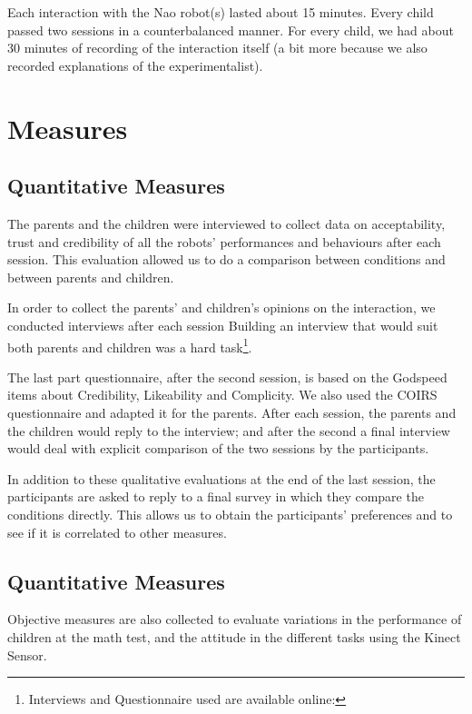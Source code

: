 \documentclass[a4paper,twocolumn]{svjour3}
\begin{document}
Each interaction with the Nao robot(s) lasted about 15 minutes. 
Every child passed two sessions in a counterbalanced manner. 
For every child, we had about 30 minutes of recording of the interaction itself (a bit more because we also recorded explanations of the experimentalist). 
 


\section{Measures}
\subsection{Quantitative Measures}

The parents and the children were interviewed to collect data on acceptability, trust and  credibility of all the robots' performances and behaviours after each session. 
This evaluation allowed us to do a comparison between conditions and between parents and children.

In order to collect the parents' and children's opinions on the interaction, we conducted interviews after each session 
Building an interview that would suit both parents and children was a hard task\footnote{Interviews and Questionnaire used are available online: }.%


The last part questionnaire, after the second session, is based on the Godspeed\cite{Bartneck2008b} items about Credibility, Likeability and Complicity. 
We also used the COIRS~\cite{Robert2014} questionnaire and adapted it for the parents.
After each session, the parents and the children would reply to the interview; and after the second a final interview would deal with explicit comparison of the two sessions by the participants.


In addition to these qualitative evaluations at the end of the last session, the participants are asked to reply to a final survey in which they compare the conditions directly. 
This allows us to obtain the participants' preferences and to see if it is correlated to other measures.

\subsection{Quantitative Measures}
Objective measures are also collected to evaluate variations in the performance of children at the math test, and the attitude in the different tasks using the Kinect Sensor.
\end{document}
